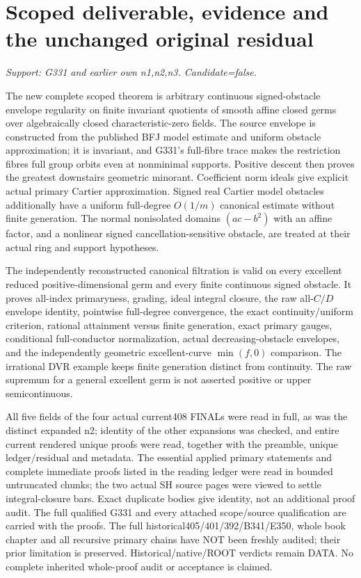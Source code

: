 \section{Scoped deliverable, evidence and the unchanged original residual}
\textit{Support: G331 and earlier own n1,n2,n3. Candidate=false.}

The new complete scoped theorem is arbitrary continuous signed-obstacle envelope regularity on finite invariant quotients of smooth affine closed germs over algebraically closed characteristic-zero fields. The source envelope is constructed from the published BFJ model estimate and uniform obstacle approximation; it is invariant, and G331's full-fibre trace makes the restriction fibres full group orbits even at nonminimal supports. Positive descent then proves the greatest downstairs geometric minorant. Coefficient norm ideals give explicit actual primary Cartier approximation. Signed real Cartier model obstacles additionally have a uniform full-degree $O(1/m)$ canonical estimate without finite generation. The normal nonisolated domains $(ac-b^2)$ with an affine factor, and a nonlinear signed cancellation-sensitive obstacle, are treated at their actual ring and support hypotheses.

The independently reconstructed canonical filtration is valid on every excellent reduced positive-dimensional germ and every finite continuous signed obstacle. It proves all-index primaryness, grading, ideal integral closure, the raw all-$C/D$ envelope identity, pointwise full-degree convergence, the exact continuity/uniform criterion, rational attainment versus finite generation, exact primary gauges, conditional full-conductor normalization, actual decreasing-obstacle envelopes, and the independently geometric excellent-curve $\min(f,0)$ comparison. The irrational DVR example keeps finite generation distinct from continuity. The raw supremum for a general excellent germ is not asserted positive or upper semicontinuous.

All five fields of the four actual current408 FINALs were read in full, as was the distinct expanded n2; identity of the other expansions was checked, and entire current rendered unique proofs were read, together with the preamble, unique ledger/residual and metadata. The essential applied primary statements and complete immediate proofs listed in the reading ledger were read in bounded untruncated chunks; the two actual SH source pages were viewed to settle integral-closure bars. Exact duplicate bodies give identity, not an additional proof audit. The full qualified G331 and every attached scope/source qualification are carried with the proofs. The full historical405/401/392/B341/E350, whole book chapter and all recursive primary chains have NOT been freshly audited; their prior limitation is preserved. Historical/native/ROOT verdicts remain DATA. No complete inherited whole-proof audit or acceptance is claimed.

